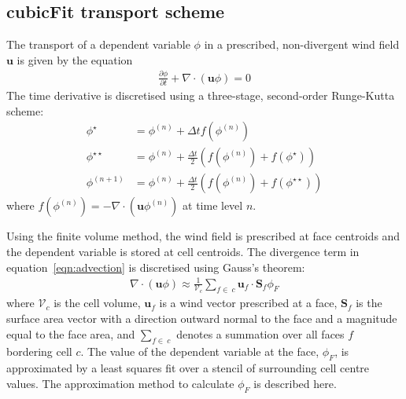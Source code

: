 \subsection{cubicFit transport scheme}


The transport of a dependent variable $\phi$ in a prescribed, non-divergent wind field $\mathbf{u}$ is given by the equation
\begin{align}
	\frac{\partial \phi}{\partial t} + \nabla \cdot \left( \mathbf{u} \phi \right) = 0 \label{eqn:advection}
\end{align}
The time derivative is discretised using a three-stage, second-order Runge-Kutta scheme:
\begin{subequations}
\begin{align}
	\phi^\star &= \phi^{(n)} + \Delta t f(\phi^{(n)}) \\
	\phi^{\star\star} &= \phi^{(n)} + \frac{\Delta t}{2} \left( f(\phi^{(n)}) + f(\phi^\star) \right) \\
	\phi^{(n+1)} &= \phi^{(n)} + \frac{\Delta t}{2} \left( f(\phi^{(n)}) + f(\phi^{\star\star}) \right)
\end{align}
\end{subequations}
where \(f(\phi^{(n)}) = - \nabla \cdot (\mathbf{u} \phi^{(n)})\) at time level \(n\).

Using the finite volume method, the wind field is prescribed at face centroids and the dependent variable is stored at cell centroids.  The divergence term in equation~\eqref{eqn:advection} is discretised using Gauss's theorem:
\begin{align}
	\nabla \cdot \left( \mathbf{u} \phi \right) \approx \frac{1}{\mathcal{V}_c} \sum_{f \in\:c} \mathbf{u}_f \cdot \mathbf{S}_f \phi_F
\end{align}
where $\mathcal{V}_c$ is the cell volume, $\mathbf{u}_f$ is a wind vector prescribed at a face, ${\mathbf{S}_f}$ is the surface area vector with a direction outward normal to the face and a magnitude equal to the face area, and $\sum_{f \in\:c}$ denotes a summation over all faces $f$ bordering cell $c$.  The value of the dependent variable at the face, $\phi_F$, is approximated by a least squares fit over a stencil of surrounding cell centre values.  The approximation method to calculate $\phi_F$ is described here.


